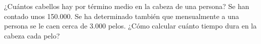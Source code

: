 ¿Cuántos cabellos hay por término medio en la cabeza de una persona? Se han contado unos 150.000. Se ha determinado también que mensualmente a una persona se le caen cerca de 3.000 pelos. ¿Cómo calcular cuánto tiempo dura en la cabeza cada pelo?
